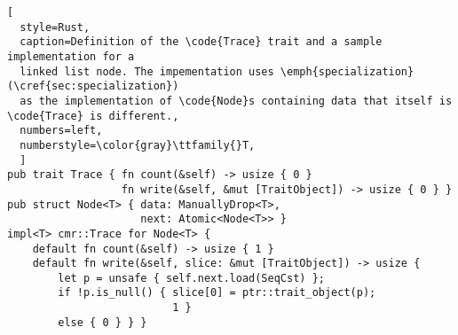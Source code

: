 \begin{lstlisting}[
  style=Rust,
  caption=Definition of the \code{Trace} trait and a sample implementation for a
  linked list node. The impementation uses \emph{specialization} (\cref{sec:specialization})
  as the implementation of \code{Node}s containing data that itself is \code{Trace} is different.,
  numbers=left,
  numberstyle=\color{gray}\ttfamily{}T,
  ]
pub trait Trace { fn count(&self) -> usize { 0 }
                  fn write(&self, &mut [TraitObject]) -> usize { 0 } }
pub struct Node<T> { data: ManuallyDrop<T>,
                     next: Atomic<Node<T>> }
impl<T> cmr::Trace for Node<T> {
    default fn count(&self) -> usize { 1 }
    default fn write(&self, slice: &mut [TraitObject]) -> usize {
        let p = unsafe { self.next.load(SeqCst) };
        if !p.is_null() { slice[0] = ptr::trait_object(p);
                          1 } 
        else { 0 } } }\end{lstlisting}
